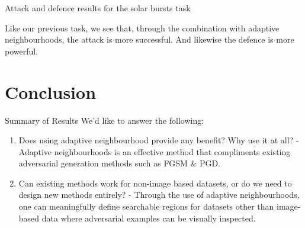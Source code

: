 \documentclass[smaller]{beamer}
\begin{document}
\begin{frame}[label={sec:org23d4987}]{Attack and defence results for the solar bursts task}
\begin{table}
\centering
\begin{adjustbox}{center}
\end{adjustbox}
\end{table}

\begin{center}
Like our previous task, we see that, through the combination with adaptive
neighbourhoods, the attack is more successful. And likewise the defence is more
powerful.
\end{center}
\end{frame}

\section{Conclusion}
\label{sec:org915a0e0}

\begin{frame}[label={sec:org3a26648}]{Summary of Results}
We'd like to answer the following:
\begin{enumerate}
\item Does using adaptive neighbourhood provide any benefit? Why use it at all? -
\alert{Adaptive neighbourhoods is an effective method that compliments existing adversarial generation methods such as FGSM \& PGD.}
\item Can existing methods work for non-image based datasets, or do we need to design
new methods entirely? - \alert{Through the use of adaptive neighbourhoods, one can
meaningfully define searchable regions for datasets other than image-based data
where adversarial examples can be visually inspected.}
\end{enumerate}
\end{frame}
\end{document}
